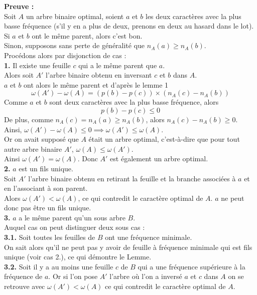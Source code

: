 \documentclass[a4paper, 12pt]{article}
\let\qed\square
\begin{document}
\textbf{Preuve :} \\
Soit $A$ un arbre binaire optimal, soient $a$ et $b$ les deux caractères avec la plus basse fréquence (s'il y en a plus de deux, prenons en deux au hasard dans le lot). \\
Si $a$ et $b$ ont le même parent, alors c'est bon. \\
Sinon, supposons sans perte de généralité que $n_A(a) \geq n_A(b)$. \\
Procédons alors par disjonction de cas : \\
\textbf{1.} Il existe une feuille $c$ qui a le même parent que $a$. \\
Alors soit $A'$ l'arbre binaire obtenu en inversant $c$ et $b$ dans $A$. \\
$a$ et $b$ ont alors le même parent et d'après le lemme 1
$$
\omega(A')-\omega(A) = (p(b) - p(c))\times(n_A(c) - n_A(b))
$$
Comme $a$ et $b$ sont deux caractères avec la plus basse fréquence, alors
$$
p(b)-p(c) \leq 0
$$
De plus, comme $n_A(c) = n_A(a) \geq n_A(b)$, alors $n_A(c)-n_A(b) \geq 0$. \\
Ainsi, $\omega(A')-\omega(A) \leq 0 \implies \omega(A') \leq \omega(A)$. \\
Or on avait supposé que $A$ était un arbre optimal, c'est-à-dire que pour tout autre arbre binaire $A'$, $\omega(A) \leq \omega(A')$. \\
Ainsi $\omega(A') = \omega(A)$. Donc $A'$ est également un arbre optimal. \\
\textbf{2.} $a$ est un fils unique. \\
Soit $A'$ l'arbre binaire obtenu en retirant la feuille et la branche associées à $a$ et en l'associant à son parent. \\
Alors $\omega(A') < \omega(A)$, ce qui contredit le caractère optimal de $A$. $a$ ne peut donc pas être un fils unique. \\
\textbf{3.} $a$ a le même parent qu'un sous arbre $B$. \\
Auquel cas on peut distinguer deux sous cas : \\
\textbf{3.1.} Soit toutes les feuilles de $B$ ont une fréquence minimale. \\
On sait alors qu'il ne peut pas y avoir de feuille à fréquence minimale qui est fils unique (voir cas 2.), ce qui démontre le Lemme. \\
\textbf{3.2.} Soit il y a au moins une feuille $c$ de $B$ qui a une fréquence supérieure à la fréquence de $a$. Or si l'on pose $A'$ l'arbre où l'on a inversé $a$ et $c$ dans $A$ on se retrouve avec $\omega(A') < \omega(A)$ ce qui contredit le caractère optimal de $A$. \\
\qed
\end{document}
